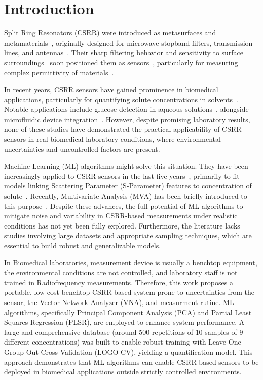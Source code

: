 \documentclass[journal,twoside,web]{ieeecolor}
\begin{document}
\section{Introduction}
\label{sec:intro}
 Split Ring Resonators (CSRR) were introduced as metasurfaces and metamaterials~\cite{falcone2004, Baena2005}, originally designed for microwave stopband filters, transmission lines, and antennas~\cite{GGarcia2005, Bonache2006, Mandal2006, Gil2007, Velez2008, Zhang2009}. Their sharp filtering behavior and sensitivity to surface surroundings~\cite{Grzegorczyk2005, Stevanovic2006, Bonache2006} soon positioned them as sensors~\cite{Boybay2012}, particularly for measuring complex permittivity of materials~\cite{Song2013, Lee2014, Lee2014_2, Ansari2015, Standaert2017, Su2019}.

In recent years, CSRR sensors have gained prominence in biomedical applications, particularly for quantifying solute concentrations in solvents~\cite{Velez2018, Omer2021, Zhang2019}. Notable applications include glucose detection in aqueous solutions~\cite{Omer2021, Martinic2025}, alongside microfluidic device integration~\cite{Patel2022, Jiang2023, Liu2024, Zhang2024}. However, despite promising laboratory results, none of these studies have demonstrated the practical applicability of CSRR sensors in real biomedical laboratory conditions, where environmental uncertainties and uncontrolled factors are present.

Machine Learning (ML) algorithms might solve this situation. They have been increasingly applied to CSRR sensors in the last five years~\cite{Prakash2022, Harrison2020, Kazemi2022, Abdolrazzaghi2023}, primarily to fit models linking Scattering Parameter (S-Parameter) features to concentration of solute~\cite{Martinic2025}. Recently, Multivariate Analysis (MVA) has been briefly introduced to this purpose~\cite{Trovarello2024}. Despite these advances, the full potential of ML algorithms to mitigate noise and variability in CSRR-based measurements under realistic conditions has not yet been fully explored. Furthermore, the literature lacks studies involving large datasets and appropriate sampling techniques, which are essential to build robust and generalizable models.

In Biomedical laboratories, measurement device is usually a benchtop equipment, the environmental conditions are not controlled, and laboratory staff is not trained in Radiofrequency measurements. Therefore, this work proposes a portable, low-cost benchtop CSRR-based system prone to uncertainties from the sensor, the Vector Network Analyzer (VNA), and measurment rutine. ML algorithms, specifically Principal Component Analysis (PCA) and Partial Least Squares Regression (PLSR), are employed to enhance system performance. A large and comprehensive database (around $500$ repetitions of $10$ samples of $9$ different concentrations) was built to enable robust training with Leave-One-Group-Out Cross-Validation (LOGO-CV), yielding a quantification model. This approach demonstrates that ML algorithms can enable CSRR-based sensors to be deployed in biomedical applications outside strictly controlled environments.
\end{document}
